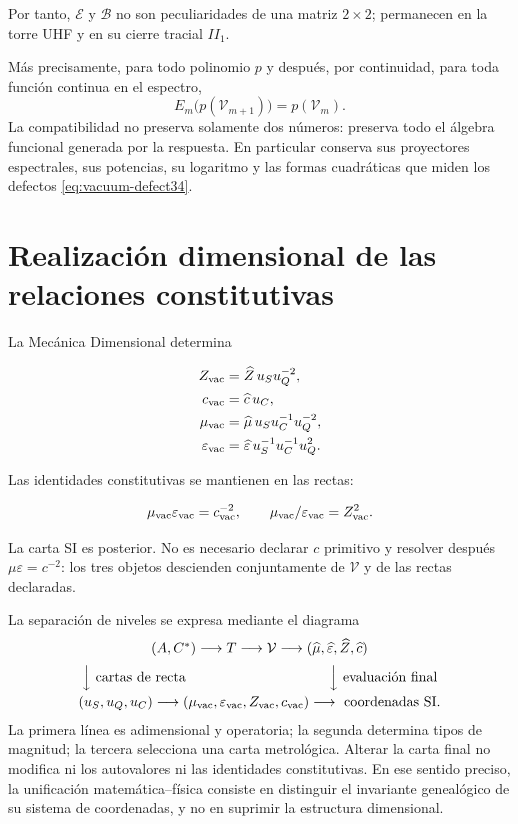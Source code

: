 Por tanto, \(\mathcal E\) y \(\mathcal B\) no son peculiaridades de una matriz \(2\times2\); permanecen en la torre UHF y en su cierre tracial \(II_1\).

M\'as precisamente, para todo polinomio \(p\) y despu\'es, por continuidad,
para toda funci\'on continua en el espectro,
\begin{equation}
E_m\bigl(p(\mathcal V_{m+1})\bigr)=p(\mathcal V_m).
\label{eq:vacuum-functional-refinement}
\end{equation}
La compatibilidad no preserva solamente dos n\'umeros: preserva todo el
\'algebra funcional generada por la respuesta. En particular conserva sus
proyectores espectrales, sus potencias, su logaritmo y las formas cuadr\'aticas
que miden los defectos \cref{eq:vacuum-defect34}.

\section{Realizaci\'on dimensional de las relaciones constitutivas}

La Mec\'anica Dimensional determina

\begin{align}
Z_{\rm vac}&=\widehat Z\,u_Su_Q^{-2},\\
c_{\rm vac}&=\widehat c\,u_C,\\
\mu_{\rm vac}&=\widehat\mu\,u_Su_C^{-1}u_Q^{-2},\\
\varepsilon_{\rm vac}&=\widehat\varepsilon\,u_S^{-1}u_C^{-1}u_Q^2.
\label{eq:vacuum-sections}
\end{align}

Las identidades constitutivas se mantienen en las rectas:

\begin{equation}
\mu_{\rm vac}\varepsilon_{\rm vac}=c_{\rm vac}^{-2},
\qquad
\mu_{\rm vac}/\varepsilon_{\rm vac}=Z_{\rm vac}^2.
\end{equation}

La carta SI es posterior. No es necesario declarar \(c\) primitivo y resolver despu\'es \(\mu\varepsilon=c^{-2}\): los tres objetos descienden conjuntamente de \(\mathcal V\) y de las rectas declaradas.

La separaci\'on de niveles se expresa mediante el diagrama
\[
\begin{array}{c}
(A,C^*)\longrightarrow T\longrightarrow\mathcal V
\longrightarrow
(\widehat\mu,\widehat\varepsilon,\widehat Z,\widehat c)
\\[2mm]
\Big\downarrow\text{ cartas de recta}\hspace{36mm}
\Big\downarrow\text{ evaluaci\'on final}
\\[2mm]
(u_S,u_Q,u_C)\longrightarrow
(\mu_{\rm vac},\varepsilon_{\rm vac},Z_{\rm vac},c_{\rm vac})
\longrightarrow\text{ coordenadas SI}.
\end{array}
\]
La primera l\'inea es adimensional y operatoria; la segunda determina tipos de
magnitud; la tercera selecciona una carta metrol\'ogica. Alterar la carta final
no modifica ni los autovalores ni las identidades constitutivas. En ese
sentido preciso, la unificaci\'on matem\'atica--f\'isica consiste en distinguir
el invariante geneal\'ogico de su sistema de coordenadas, y no en suprimir la
estructura dimensional.

